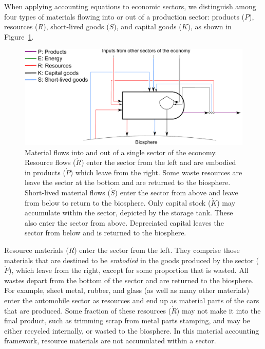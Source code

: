 When applying accounting equations to economic sectors,
we distinguish among four types of
materials flowing into or out of a production sector: 
products ($P$), resources ($R$),
short-lived goods ($S$),
and capital goods ($K$), 
as shown in Figure~\ref{fig:PERKS_materials}.

\begin{figure}[!ht]
\centering{}
\includegraphics[width=\linewidth]{Part_1/Chapter_Materials/images/PERKS_basic_unit_materials.pdf}
\caption[Material flows into and out of a single sector 
of the economy]{Material flows into and out of 
a single sector of the economy. 
Resource flows ($\dot{R}$) enter the sector from the left 
and are embodied in products ($\dot{P}$) which leave from the right. 
Some waste resources are leave the sector at the 
bottom and are returned to the biosphere.
Short-lived material flows ($\dot{S}$) 
enter the sector from above and leave from below to return to the biosphere. 
Only capital stock ($\dot{K}$) may accumulate within the sector,
depicted by the storage tank.
These also enter the sector from above. 
Depreciated capital leaves the sector from below and is returned to the biosphere.}
\label{fig:PERKS_materials}
\end{figure}

Resource materials ($\dot{R}$)
enter the sector from the left.
They comprise those materials that are destined to be \emph{embodied} 
in the goods produced by the sector ($\dot{P}$), which leave from the right,
except for some proportion that is wasted.
All wastes depart from the bottom of the sector and are
returned to the biosphere. 
For example, sheet metal, rubber, and glass
(as well as many other materials) 
enter the automobile sector as resources 
and end up as material parts of the cars that are produced. 
Some fraction of these resources ($\dot{R}$) may not make it into the final product, 
such as trimming scrap from metal parts stamping, 
and may be either recycled internally, 
or wasted to the biosphere. 
In this material accounting framework, 
resource materials are not accumulated within a sector.


